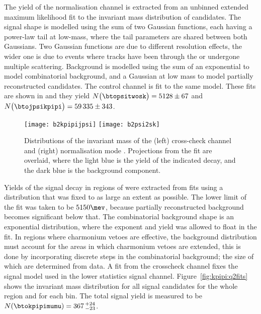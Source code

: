The yield  of the normalisation channel is extracted from an unbinned extended maximum likelihood
fit to the invariant mass distribution of \btopsitwosk candidates.
The signal shape is modelled using the sum of two Gaussian functions, each having a power-law
tail at low-mass, where the tail parameters are shared between both Gaussians.
Two Gaussian functions are due to different resolution effects, the wider one is due to events
where tracks have been through the \ot or undergone multiple scattering.
Background is modelled using the sum of an exponential to model combinatorial background, and a
Gaussian at low mass to model partially reconstructed candidates.
The control channel \btojpsikpipi is fit to the same model.
These fits are shown in  and they yield
$N\big(\btopsitwosk\big)=5128\pm67$ and $N\big(\btojpsikpipi\big)=59\,335\pm343$.

\begin{figure}
  \begin{center}
    \texttt{[image: b2kpipijpsi]}
    \texttt{[image: b2psi2sk]}
    \caption[Fits to \btojpsikpipi and \btopsitwosk candidates]
    {
      Distributions of the invariant mass of the
      (left) cross-check channel \btojpsikpipi and
      (right) normalisation mode \btopsitwosk.
      Projections from the fit are overlaid, where the light blue is the yield of the indicated
      decay, and the dark blue is the background component.
    }
    \label{fig:kpipi:norm}
  \end{center}
\end{figure}


Yields of the signal decay in regions of \qsq were extracted from fits using a distribution that
was fixed to as large an extent as possible.
The lower limit of the fit was taken to be $5150\mev$, because partially reconstructed background
becomes significant below that.
The combinatorial background shape is an exponential distribution, where the exponent and yield was
allowed to float in the fit.
In \qsq regions where charmonium vetoes are effective, the background distribution must account for
the areas in which charmonium vetoes are extended, this is done by incorporating discrete steps in
the combinatorial background; the size of which are determined from data.
A fit from the crosscheck channel fixes the signal model used in the lower statistics signal
channel.
Figure~\ref{fig:kpipi:q2fits} shows the invariant mass distribution for all signal
candidates for the whole \qsq region and for each bin.
The total signal yield is measured to be $N(\btokpipimumu)=367\,^{+24}_{-23}$.

